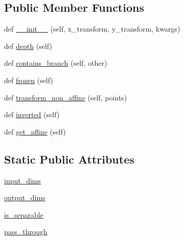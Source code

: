 \subsection*{Public Member Functions}
\begin{DoxyCompactItemize}
\item 
def \hyperlink{classmatplotlib_1_1transforms_1_1BlendedGenericTransform_a740fed126c92a23be0cf06f4cbc62e3d}{\+\_\+\+\_\+init\+\_\+\+\_\+} (self, x\+\_\+transform, y\+\_\+transform, kwargs)
\item 
def \hyperlink{classmatplotlib_1_1transforms_1_1BlendedGenericTransform_aa90d3aa8274240b48e0a74d5cb27ae56}{depth} (self)
\item 
def \hyperlink{classmatplotlib_1_1transforms_1_1BlendedGenericTransform_aac2192c8b2ec4949638f89d58936c3f4}{contains\+\_\+branch} (self, other)
\item 
def \hyperlink{classmatplotlib_1_1transforms_1_1BlendedGenericTransform_a3827f004a8602ab96d633ffe40454bc3}{frozen} (self)
\item 
def \hyperlink{classmatplotlib_1_1transforms_1_1BlendedGenericTransform_ad66214b99be29e88d87a100ff6b2396c}{transform\+\_\+non\+\_\+affine} (self, points)
\item 
def \hyperlink{classmatplotlib_1_1transforms_1_1BlendedGenericTransform_ad211a0f27ab6107c4bd1e810e8fbb1dd}{inverted} (self)
\item 
def \hyperlink{classmatplotlib_1_1transforms_1_1BlendedGenericTransform_a4f7fdd902f0bee7b7babed463a665e4b}{get\+\_\+affine} (self)
\end{DoxyCompactItemize}
\subsection*{Static Public Attributes}
\begin{DoxyCompactItemize}
\item 
\hyperlink{classmatplotlib_1_1transforms_1_1BlendedGenericTransform_add96d9abbbda5fa15aa58ce2701eff0f}{input\+\_\+dims}
\item 
\hyperlink{classmatplotlib_1_1transforms_1_1BlendedGenericTransform_a20d006926fff791b57dfb0c329a9f201}{output\+\_\+dims}
\item 
\hyperlink{classmatplotlib_1_1transforms_1_1BlendedGenericTransform_af8974614784ed9092ae117eacdee2e7b}{is\+\_\+separable}
\item 
\hyperlink{classmatplotlib_1_1transforms_1_1BlendedGenericTransform_a021fa72f9432d6ff1bc7b40e92ad618b}{pass\+\_\+through}
\end{DoxyCompactItemize}
